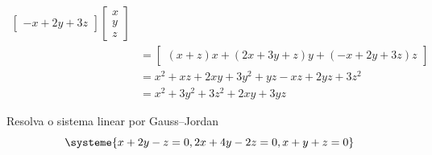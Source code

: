 \documentclass[a4paper,12pt,fleqn]{article}
\begin{document}
\begin{answer}
\begin{align*}
\begin{bmatrix}
      -x + 2y + 3z
    \end{bmatrix}
    \begin{bmatrix}
      x \\ y \\ z
    \end{bmatrix}
    \\[2mm]
    & =
    \begin{bmatrix}
      (x + z)x +
      (2x + 3y + z)y +
      (-x + 2y + 3z)z
    \end{bmatrix}
    \\[2mm]
    & =
      x^2 + xz
      + 2xy + 3y^2 + yz
      - xz + 2yz + 3z^2
    \\[2mm]
    & =
      x^2 + 3y^2 + 3z^2 + 2xy + 3yz
  \end{align*}
\end{answer}

Resolva o sistema linear por Gauss--Jordan
\[
  \systeme{
     x + 2y -  z = 0,
    2x + 4y - 2z = 0,
     x +  y +  z = 0
  }
\]
\end{document}
